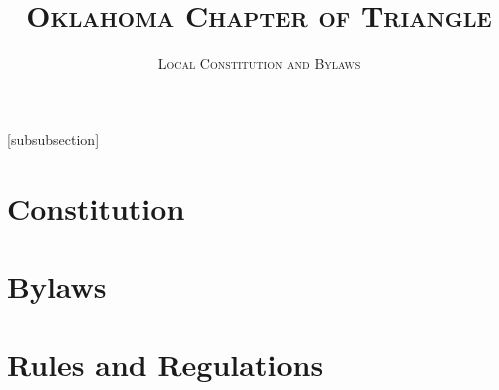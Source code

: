 \documentclass{article}
\title{\textsc{Oklahoma Chapter of Triangle}}
\subtitle{\textsc{Local Constitution and Bylaws}}
\begin{document}
\let\oldsec\section
\let\oldsubsec\subsection
\let\oldsubsubsec\subsubsection
\renewcommand{\part}[1]{\oldsubsec{\textsc{#1}}}
\newcommand{\article}[1]{\oldsubsubsec{\textsc{#1}}}
[subsubsection]
\renewcommand{\section}{
    \stepcounter{ArticleSection}
    \textbf{Section \arabic{ArticleSection}:\ }
}

\setcounter{tocdepth}{3}

\maketitle
\tableofcontents

\pagebreak
\oldsec{Constitution}


\pagebreak
\oldsec{Bylaws}


\oldsec{Rules and Regulations}

\end{document}
